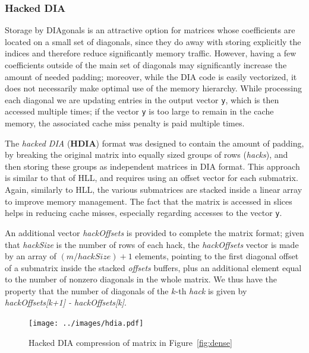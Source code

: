 \subsubsection*{Hacked DIA}

Storage by DIAgonals is an attractive option for matrices whose
coefficients are located on a small set of diagonals, since they do
away with storing explicitly the indices and therefore reduce
significantly memory traffic. However, having a few coefficients
outside of the main set of diagonals may  significantly increase the
amount of needed padding; moreover, while the DIA code is easily
vectorized, it does not necessarily make optimal use of the memory
hierarchy. While processing each diagonal we are updating entries in
the output vector \verb|y|, which is then accessed multiple times; if 
the vector \verb|y| is too large to remain in the cache memory, the
associated cache miss penalty is paid multiple times. 

The \textit{hacked DIA} (\textbf{HDIA}) format was designed to contain
the amount of padding, by  breaking  the original matrix
into equally sized groups of rows (\textit{hacks}), and then storing
these groups as independent matrices in DIA format. This approach is
similar to that of HLL, and requires using an offset vector for each
submatrix. Again, similarly to HLL, the various submatrices are
stacked inside a linear array to improve memory management. The fact
that the matrix is accessed in slices helps in reducing cache misses,
especially regarding accesses to the %
vector \verb|y|.  


An additional vector \textit{hackOffsets} is provided to complete
the matrix format; given  that \textit{hackSize} is the number of rows of each hack,
the \textit{hackOffsets} vector is made by an array of
$(m/hackSize)+1$ elements,  pointing to the first diagonal offset of a
submatrix inside the stacked \textit{offsets} buffers, plus an
additional element equal to the number of nonzero diagonals in the whole matrix. 
We thus have the property that  
the number of diagonals of the $k$-th \textit{hack} is given by
\textit{hackOffsets[k+1] - hackOffsets[k]}.  

\begin{figure}[ht]
	\centering
		\texttt{[image: ../images/hdia.pdf]}
	\caption{Hacked DIA compression of matrix in Figure~\ref{fig:dense}}
	\label{fig:hdia}
\end{figure} 

